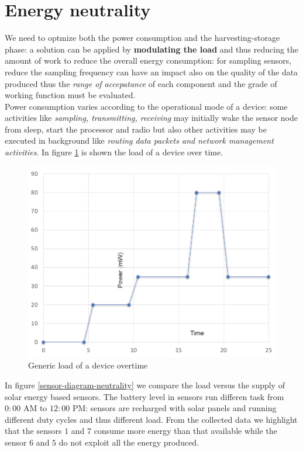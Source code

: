 \documentclass[10pt,a4paper]{report}
\theoremstyle{definition}
\begin{document}
\section{Energy neutrality}\label{sec:energy-neutrality}
We need to optmize both the power consumption and the harvesting-storage phase: a solution can be applied by \textbf{modulating the load} and thus reducing the amount of work to reduce the overall energy consumption: for sampling sensors, reduce the sampling frequency can have an impact also on the quality of the data produced thus the \textit{range of accepatance} of each component and the grade of working function must be evaluated.\\
Power consumption varies according to the operational mode of a device: some activities like \textit{sampling, transmitting, receiving} may initially wake the sensor node from sleep, start the processor and radio but also other activities may be executed in background like \textit{routing data packets and network management activities}. In figure \ref{generic-load} is shown the load of a device over time.
\begin{figure}[h!]
	\centering\includegraphics[scale=0.30]{images/Pasted image 20230506093616.png}
	\caption{Generic load of a device overtime}
	\label{generic-load}
\end{figure}


In figure \ref{sensor-diagram-neutrality} we compare the load versus the supply of solar energy based sensors.
The battery level in sensors run differen task from $0:00$ AM to $12:00$ PM: sensors are recharged with solar panels and running different duty cycles and thus different load.
From the collected data we highlight that the sensors $1$ and $7$ consume more energy than that available while the sensor $6$ and $5$ do not exploit all the energy produced.
\end{document}
